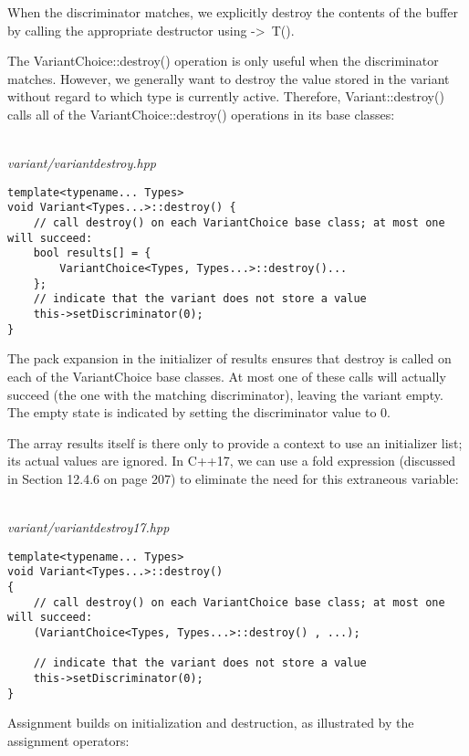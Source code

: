 When the discriminator matches, we explicitly destroy the contents of the buffer by calling the appropriate destructor using ->~T(). 

The VariantChoice::destroy() operation is only useful when the discriminator matches. However, we generally want to destroy the value stored in the variant without regard to which type is currently active. Therefore, Variant::destroy() calls all of the VariantChoice::destroy() operations in its base classes:

\hspace*{\fill} \\ %
\noindent
\textit{variant/variantdestroy.hpp}
\begin{lstlisting}[style=styleCXX]
template<typename... Types>
void Variant<Types...>::destroy() {
	// call destroy() on each VariantChoice base class; at most one will succeed:
	bool results[] = {
		VariantChoice<Types, Types...>::destroy()...
	};
	// indicate that the variant does not store a value
	this->setDiscriminator(0);
}
\end{lstlisting}

The pack expansion in the initializer of results ensures that destroy is called on each of the VariantChoice base classes. At most one of these calls will actually succeed (the one with the matching discriminator), leaving the variant empty. The empty state is indicated by setting the discriminator value to 0.

The array results itself is there only to provide a context to use an initializer list; its actual values are ignored. In C++17, we can use a fold expression (discussed in Section 12.4.6 on page 207) to eliminate the need for this extraneous variable:

\hspace*{\fill} \\ %
\noindent
\textit{variant/variantdestroy17.hpp}
\begin{lstlisting}[style=styleCXX]
template<typename... Types>
void Variant<Types...>::destroy()
{
	// call destroy() on each VariantChoice base class; at most one will succeed:
	(VariantChoice<Types, Types...>::destroy() , ...);
	
	// indicate that the variant does not store a value
	this->setDiscriminator(0);
}
\end{lstlisting}



Assignment builds on initialization and destruction, as illustrated by the assignment operators:

